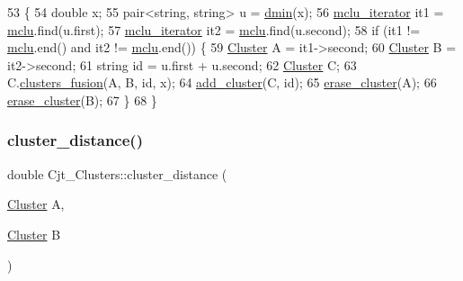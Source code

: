 \begin{DoxyCode}
53                                    \{
54     \textcolor{keywordtype}{double} x;
55     pair<string, string> u = \hyperlink{class_cjt___clusters_a3db57ec9903b4f5439679ac9ba41fab1}{dmin}(x);
56     \hyperlink{class_cjt___clusters_ad9cf46a8e1e6430c7b34b184f2756054}{mclu\_iterator} it1 = \hyperlink{class_cjt___clusters_a5f5e13255bca1fac2ad65c51473f6ead}{mclu}.find(u.first);
57     \hyperlink{class_cjt___clusters_ad9cf46a8e1e6430c7b34b184f2756054}{mclu\_iterator} it2 = \hyperlink{class_cjt___clusters_a5f5e13255bca1fac2ad65c51473f6ead}{mclu}.find(u.second);
58     \textcolor{keywordflow}{if} (it1 != \hyperlink{class_cjt___clusters_a5f5e13255bca1fac2ad65c51473f6ead}{mclu}.end() and it2 != \hyperlink{class_cjt___clusters_a5f5e13255bca1fac2ad65c51473f6ead}{mclu}.end()) \{
59         \hyperlink{class_cluster}{Cluster} A = it1->second;
60         \hyperlink{class_cluster}{Cluster} B = it2->second;
61         \textcolor{keywordtype}{string} \textcolor{keywordtype}{id} = u.first + u.second;
62         \hyperlink{class_cluster}{Cluster} C;
63         C.\hyperlink{class_cluster_a6b25af7d4f702db942878dba136fe0c2}{clusters\_fusion}(A, B, \textcolor{keywordtype}{id}, x);
64         \hyperlink{class_cjt___clusters_ace64164c455de6b3e91b774ad95d93ac}{add\_cluster}(C, \textcolor{keywordtype}{id});
65         \hyperlink{class_cjt___clusters_a779452d093c92ec42e47987a84ea48ff}{erase\_cluster}(A);
66         \hyperlink{class_cjt___clusters_a779452d093c92ec42e47987a84ea48ff}{erase\_cluster}(B);
67     \}
68 \}
\end{DoxyCode}
\mbox{\label{class_cjt___clusters_acd0e381a6b4c43933b3c6761febf9b3e}} 
\subsubsection{\texorpdfstring{cluster\+\_\+distance()}{cluster\_distance()}}
{\footnotesize\ttfamily double Cjt\+\_\+\+Clusters\+::cluster\+\_\+distance (\begin{DoxyParamCaption}\item[{\hyperlink{class_cluster}{Cluster}}]{A,  }\item[{\hyperlink{class_cluster}{Cluster}}]{B }\end{DoxyParamCaption})}



